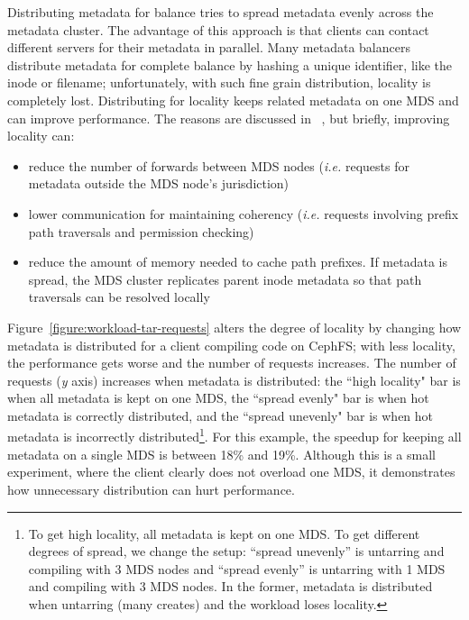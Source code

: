 Distributing metadata for balance tries to spread metadata evenly across the metadata cluster. The advantage of this approach is that clients can contact different servers for their metadata in parallel. Many metadata balancers distribute metadata for complete balance by hashing a unique identifier, like the inode or filename; unfortunately, with such fine grain distribution, locality is completely lost. Distributing for locality keeps related metadata on one MDS and can improve performance. The reasons are discussed in ~\cite{weil:phdthesis07, weil:sc2004-dyn-metadata}, but briefly, improving locality can: 
\begin{itemize}
	\item reduce the number of forwards between MDS nodes ({\it i.e.} requests for metadata outside the MDS node's jurisdiction)
	\item lower communication for maintaining coherency ({\it i.e.} requests involving prefix path traversals and permission checking)
	\item reduce the amount of memory needed to cache path prefixes. If metadata is spread, the MDS cluster replicates parent inode metadata so that path traversals can be resolved locally
\end{itemize}

Figure~\ref{figure:workload-tar-requests} alters the degree of locality by changing how metadata is distributed for a client compiling code on CephFS; with less locality, the performance gets worse and the number of requests increases. The number of requests ({\it y} axis) increases when metadata is distributed: the ``high locality" bar is when all metadata is kept on one MDS, the ``spread evenly" bar is when hot metadata is correctly distributed, and the ``spread unevenly" bar is when hot metadata is incorrectly distributed\footnote{To get high locality, all metadata is kept on one MDS. To get different degrees of spread, we change the setup: ``spread unevenly'' is untarring and compiling with 3 MDS nodes and ``spread evenly'' is untarring with 1 MDS and compiling with 3 MDS nodes. In the former, metadata is distributed when untarring (many creates) and the workload loses locality.}. For this example, the speedup for keeping all metadata on a single MDS is between 18\% and 19\%. Although this is a small experiment, where the client clearly does not overload one MDS, it demonstrates how unnecessary distribution can hurt performance.

